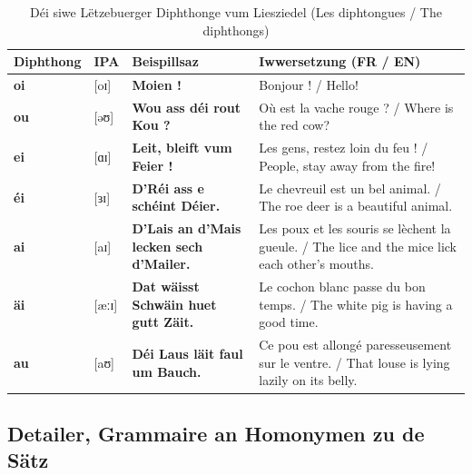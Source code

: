 \begin{table}[htbp]
    \centering
    \small
    \begin{tabular}{llp{5.5cm}p{5.2cm}}
        \toprule
        \textbf{Diphthong} & \textbf{IPA} & \textbf{Beispillsaz} & \textbf{Iwwersetzung (FR / EN)} \\
        \midrule
        \textbf{oi} & {[oɪ]} & \textbf{Moien !} & Bonjour ! / Hello! \\
        \textbf{ou} & {[əʊ]} & \textbf{Wou ass déi rout Kou ?} & Où est la vache rouge ? / Where is the red cow? \\
        \textbf{ei} & {[ɑɪ]} & \textbf{Leit, bleift vum Feier !} & Les gens, restez loin du feu ! / People, stay away from the fire! \\
        \textbf{éi} & {[ɜɪ]} & \textbf{D'Réi ass e schéint Déier.} & Le chevreuil est un bel animal. / The roe deer is a beautiful animal. \\
        \textbf{ai} & {[aɪ]} & \textbf{D'Lais an d'Mais lecken sech d'Mailer.} & Les poux et les souris se lèchent la gueule. / The lice and the mice lick each other's mouths. \\
        \textbf{äi} & {[æːɪ]} & \textbf{Dat wäisst Schwäin huet gutt Zäit.} & Le cochon blanc passe du bon temps. / The white pig is having a good time. \\
        \textbf{au} & {[aʊ]} & \textbf{Déi Laus läit faul um Bauch.} & Ce pou est allongé paresseusement sur le ventre. / That louse is lying lazily on its belly. \\
        \bottomrule
    \end{tabular}
    \caption{Déi siwe Lëtzebuerger Diphthonge vum Liesziedel (Les diphtongues / The diphthongs)}
\end{table}

\subsection{Detailer, Grammaire an Homonymen zu de Sätz}

